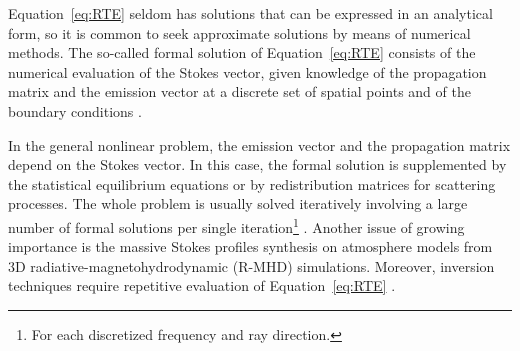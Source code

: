 \documentclass[iop,numberedappendix,twocolappendix,twocolumn]{emulateapj}
\begin{document}

Equation~\eqref{eq:RTE} seldom has
solutions that can be expressed in an analytical form, so it is common to seek approximate
solutions by means of numerical methods.
The so-called formal solution of Equation~\eqref{eq:RTE} consists of the numerical evaluation of the Stokes vector, given knowledge of the propagation matrix and the emission vector at a discrete set of spatial points and of the boundary conditions \citep{auer2003}. 

In the general nonlinear problem, the emission vector and the propagation matrix depend on the Stokes vector.
In this case, the formal solution is supplemented by the statistical equilibrium equations or by redistribution matrices for scattering processes. The whole problem is usually solved iteratively involving a large number of formal solutions per single iteration\footnote{For each discretized frequency and ray direction.} \citep{trujillo_bueno2003,landi_deglinnocenti+landolfi2004}.
Another issue of growing importance is the massive Stokes profiles synthesis on atmosphere models from 3D radiative-magnetohydrodynamic (R-MHD) simulations.
Moreover, inversion techniques require repetitive evaluation of Equation~\eqref{eq:RTE} \citep{bellot2000,deltoro_iniesta2016}.
\end{document}
